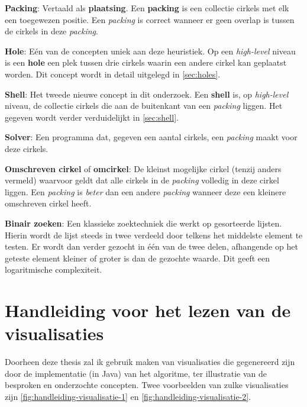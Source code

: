 \documentclass[12pt,a4paper,oneside]{book}
\begin{document}
\textbf{Packing}: Vertaald als \textbf{plaatsing}. Een \textbf{packing} is een collectie cirkels met elk een toegewezen positie. Een \textit{packing} is correct wanneer er geen overlap is tussen de cirkels in deze \textit{packing}.

\textbf{Hole}: Eén van de concepten uniek aan deze heuristiek. Op een \textit{high-level} niveau is een \textbf{hole} een plek tussen drie cirkels waarin  een andere cirkel kan geplaatst worden. Dit concept wordt in detail uitgelegd in \autoref{sec:holes}.

\textbf{Shell}: Het tweede nieuwe concept in dit onderzoek. Een \textbf{shell} is, op \textit{high-level} niveau, de collectie cirkels die aan de buitenkant van een \textit{packing} liggen. Het gegeven wordt verder verduidelijkt in \autoref{sec:shell}.

\textbf{Solver}: Een programma dat, gegeven een aantal cirkels, een \textit{packing} maakt voor deze cirkels.

\textbf{Omschreven cirkel} of \textbf{omcirkel}: De kleinst mogelijke cirkel (tenzij anders vermeld) waarvoor geldt dat alle cirkels in de \textit{packing} volledig in deze cirkel liggen. Een \textit{packing} is \textit{beter} dan een andere \textit{packing} wanneer deze een kleinere omschreven cirkel heeft.

\textbf{Binair zoeken}: Een klassieke zoektechniek die werkt op gesorteerde lijsten. Hierin wordt de lijst steeds in twee verdeeld door telkens het middelste element te testen. Er wordt dan verder gezocht in één van de twee delen, afhangende op het geteste element kleiner of groter is dan de gezochte waarde. Dit geeft een logaritmische complexiteit.

\chapter{Handleiding voor het lezen van de visualisaties} \label{chap:handleiding-visualisaties}

Doorheen deze thesis zal ik gebruik maken van visualisaties die gegenereerd zijn door de implementatie (in Java) van het algoritme, ter illustratie van de besproken en onderzochte concepten.
Twee voorbeelden van zulke visualisaties zijn \autoref{fig:handleiding-visualisatie-1} en \autoref{fig:handleiding-visualisatie-2}.
\end{document}
